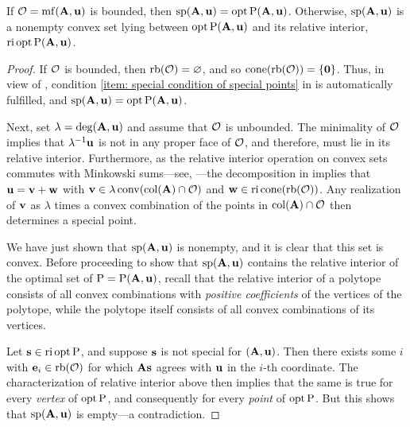 \documentclass{amsart}
\begin{document}
\begin{proposition}
   \label{opt versus mc: P}
   If $\mathcal{O} = \operatorname{mf}(\mathbf{A}, \mathbf{u})$ is bounded, then $\operatorname{sp}(\mathbf{A}, \mathbf{u}) = \operatorname{opt} \mathrm{P}(\mathbf{A}, \mathbf{u})$.
   Otherwise, $\operatorname{sp}(\mathbf{A}, \mathbf{u})$ is a nonempty convex set lying between $\operatorname{opt} \mathrm{P}(\mathbf{A}, \mathbf{u})$ and its relative interior, $\operatorname{ri} \operatorname{opt} \mathrm{P}(\mathbf{A}, \mathbf{u})$.
\end{proposition}

\begin{proof}
   If $\mathcal{O}$ is bounded, then $\operatorname{rb}(\mathcal{O}) = \varnothing$, and so $\operatorname{cone}( \operatorname{rb}(\mathcal{O})) = \{\mathbf{0} \}$.
   Thus, in view of , condition \eqref{item: special condition of special points} in  is automatically fulfilled, and $\operatorname{sp}(\mathbf{A}, \mathbf{u}) = \operatorname{opt} \mathrm{P}(\mathbf{A}, \mathbf{u})$.

   Next, set $\lambda = \operatorname{deg}(\mathbf{A},\mathbf{u})$ and assume that $\mathcal{O}$ is unbounded.
   The minimality of $\mathcal{O}$ implies that $\lambda^{-1}\mathbf{u}$ is not in any proper face of $\mathcal{O}$, and therefore, must lie in its relative interior.
   Furthermore, as the relative interior operation on convex sets commutes with Minkowski sums---see, \eg \cite[Theorem 4.10(b)]{vantiel.convex_analysis}---the decomposition in   implies that $\mathbf{u} = \mathbf{v} + \mathbf{w}$ with $\mathbf{v} \in \lambda \operatorname{conv}(\operatorname{col}(\mathbf{A}) \cap \mathcal{O})$ and $\mathbf{w} \in \operatorname{ri} \operatorname{cone}(\operatorname{rb}(\mathcal{O}))$.  Any realization of $\mathbf{v}$ as $\lambda$ times a convex combination of the points in $\operatorname{col}(\mathbf{A}) \cap \mathcal{O}$ then determines a special point.

   We have just shown that $\operatorname{sp}(\mathbf{A}, \mathbf{u})$ is nonempty, and it is clear that this set is convex.
   Before proceeding to show that $\operatorname{sp}(\mathbf{A}, \mathbf{u})$ contains the relative interior of the optimal set of $\mathrm{P} = \mathrm{P}(\mathbf{A},\mathbf{u})$, recall that the relative interior of a polytope consists of all convex combinations with \emph{positive coefficients} of the vertices of the polytope, while the polytope itself consists of all convex combinations of its vertices.

  Let $\mathbf{s} \in \operatorname{ri} \operatorname{opt} \mathrm{P}$, and suppose $\mathbf{s}$ is not special for $(\mathbf{A},\mathbf{u})$.
  Then there exists some $i$ with $\mathbf{e}_i \in \operatorname{rb}(\mathcal{O})$ for which $\mathbf{A}\mathbf{s}$ agrees with $\mathbf{u}$ in the $i$-th coordinate.
  The characterization of relative interior above then implies that the same is true for every \emph{vertex} of $\operatorname{opt} \mathrm{P}$, and consequently for every \emph{point} of $\operatorname{opt} \mathrm{P}$.
  But this shows that $\operatorname{sp}(\mathbf{A},\mathbf{u})$ is empty---a contradiction.
\end{proof}
\end{document}
